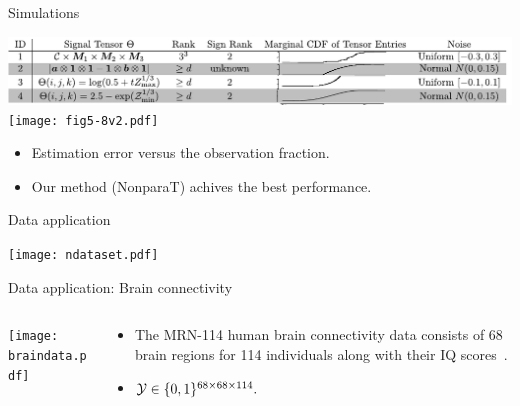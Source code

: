 \documentclass[10pt, mathserif]{beamer} %
\theoremstyle{definition}
\theoremstyle{plain}
\begin{document}
\begin{frame}{Simulations}
    \begin{center}
    \includegraphics[width = \textwidth]{simulation.pdf}
    \texttt{[image: fig5-8v2.pdf]}
    \end{center}
    \begin{itemize}
        \item Estimation error versus the observation fraction.
        \item Our method (NonparaT) achives the best performance.
    \end{itemize}
\end{frame}

\begin{frame}{Data application}
    \begin{center}
    \texttt{[image: ndataset.pdf]}
    \end{center}
\end{frame}

\begin{frame}{Data application: Brain connectivity}
\begin{columns}
\begin{column}{0.21\textwidth}
   \begin{center}
     \texttt{[image: braindata.pdf]}
     \end{center}
\end{column}
\begin{column}{0.7\textwidth} 
\begin{itemize}
    \item The MRN-114 human brain connectivity data consists of 68 brain regions for 114 individuals along with their IQ scores~\citep{wang2017bayesian}.
    \item  $\mathcal{Y}\in\{0,1\}^{68\times68\times114}.$
\end{itemize}
\end{column}
\end{columns}
\end{frame}
\end{document}
